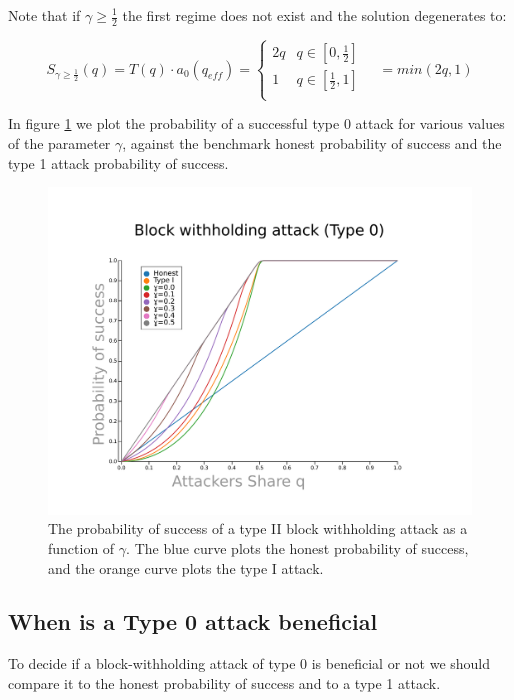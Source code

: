 \documentclass[letterpaper,12pt]{report}
\theoremstyle{plain}
\theoremstyle{definition}
\begin{document}
Note that if $\gamma\geq\frac{1}{2}$ the first regime does not exist and the solution degenerates to:

\begin{equation}\label{sofq2}
S_{\gamma\geq\frac{1}{2}}(q)=T(q)\cdot a_0(q_{eff})=
\begin{cases}
2q & q\in [0,\frac{1}{2}] \\ 
1 & q\in [\frac{1}{2},1] \\ 
\end{cases} \quad = min(2q,1)
\end{equation}

In figure \ref{fig:type0pos} we plot the probability of a successful type 0 attack for various values of the parameter $\gamma$, against the benchmark honest probability of success and the type 1 attack probability of success.


\begin{figure}[blockwithholdingtype2]
\centering
\includegraphics[width=200mm]{type0pos.pdf}
\caption{The probability of success of a type II block withholding attack as a function of $\gamma$. The blue curve plots the honest probability of success, and the orange curve plots the type I attack.}
\label{fig:type0pos}
\end{figure}

\subsection{When is a Type 0 attack beneficial}

To decide if a block-withholding attack of type 0 is beneficial or not we should compare it to the honest probability of success and to a type 1 attack. 
\end{document}
